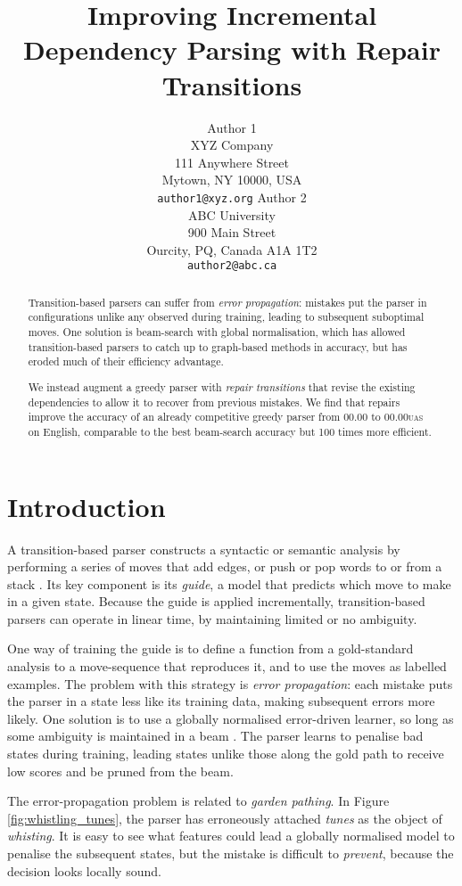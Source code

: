 \documentclass[11pt,letterpaper]{article}
\title{Improving Incremental Dependency Parsing with Repair Transitions}
\author{Author 1\\
	    XYZ Company\\
	    111 Anywhere Street\\
	    Mytown, NY 10000, USA\\
	    {\tt author1@xyz.org}
	  \And
	Author 2\\
  	ABC University\\
  	900 Main Street\\
  	Ourcity, PQ, Canada A1A 1T2\\
  {\tt author2@abc.ca}}
\date{}
\newcommand{\baseacc}{00.00\xspace}
\newcommand{\sysacc}{00.00\xspace}
\newcommand{\uas}{\textsc{uas}\xspace}
\begin{document}
\maketitle
\begin{abstract}
    Transition-based parsers can suffer from \emph{error propagation}: mistakes put the parser in configurations unlike any observed during training, leading to subsequent suboptimal moves.
One solution is beam-search with global normalisation,
which has allowed transition-based parsers to catch up to graph-based methods in
accuracy, but has eroded much of their efficiency advantage.

We instead augment a greedy parser with \emph{repair transitions} that revise
the existing dependencies to allow it to recover from previous mistakes. We find that
repairs improve the accuracy of an already competitive greedy parser from \baseacc to
\sysacc \uas on English, comparable to the best beam-search accuracy
but 100 times more efficient.
\end{abstract}

\section{Introduction}

A transition-based parser constructs a syntactic or semantic analysis by
performing a series of moves that add edges, or push or pop
words to or from a stack \citep{nivre:04}. Its key component
is its \emph{guide}, a model that predicts which move to make in a given
state. Because the guide is applied incrementally, transition-based parsers can
operate in linear time, by maintaining limited or no ambiguity.

One way of training the guide is to define a function from a gold-standard analysis
to a move-sequence that reproduces it, and to use the moves as labelled examples.
The problem with this strategy is \emph{error propagation}: each mistake puts
the parser in a state less like its training data, making subsequent errors more likely.
One solution is to use a globally normalised error-driven learner,
so long as some ambiguity is maintained in a beam \citep{zhang:08}. The parser
learns to penalise bad states during training, leading states unlike those along
the gold path to receive low scores and be pruned from the beam.

The error-propagation problem is related to \emph{garden pathing}.
In Figure \ref{fig:whistling_tunes},
the parser has erroneously attached \emph{tunes} as the object of \emph{whisting}.
It is easy to see what features could lead a globally normalised model to penalise
the subsequent states, but the mistake is difficult to \emph{prevent},
because the decision looks locally sound.
\end{document}
